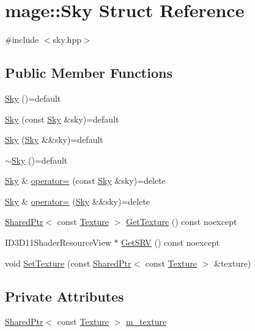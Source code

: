 \hypertarget{structmage_1_1_sky}{}\section{mage\+:\+:Sky Struct Reference}
\label{structmage_1_1_sky}


{\ttfamily \#include $<$sky.\+hpp$>$}

\subsection*{Public Member Functions}
\begin{DoxyCompactItemize}
\item 
\hyperlink{structmage_1_1_sky_a4e54074f11814aee89e2554f35e551aa}{Sky} ()=default
\item 
\hyperlink{structmage_1_1_sky_ab041650afed6344cd7874308def5c35c}{Sky} (const \hyperlink{structmage_1_1_sky}{Sky} \&sky)=default
\item 
\hyperlink{structmage_1_1_sky_acf43250f4e0af2e3ab262c6c36b19a9a}{Sky} (\hyperlink{structmage_1_1_sky}{Sky} \&\&sky)=default
\item 
\hyperlink{structmage_1_1_sky_a42c605bd010c1c6576c3ecf32cd0e962}{$\sim$\+Sky} ()=default
\item 
\hyperlink{structmage_1_1_sky}{Sky} \& \hyperlink{structmage_1_1_sky_a1ed7e2e383a87025347ee63b25f0f544}{operator=} (const \hyperlink{structmage_1_1_sky}{Sky} \&sky)=delete
\item 
\hyperlink{structmage_1_1_sky}{Sky} \& \hyperlink{structmage_1_1_sky_a07e7ad68f471344d06357ea68b82ef84}{operator=} (\hyperlink{structmage_1_1_sky}{Sky} \&\&sky)=delete
\item 
\hyperlink{namespacemage_a1e01ae66713838a7a67d30e44c67703e}{Shared\+Ptr}$<$ const \hyperlink{classmage_1_1_texture}{Texture} $>$ \hyperlink{structmage_1_1_sky_abd49f247b3a376475471310d6396386b}{Get\+Texture} () const noexcept
\item 
I\+D3\+D11\+Shader\+Resource\+View $\ast$ \hyperlink{structmage_1_1_sky_ae72817d4b5015b985234183b6474f5d6}{Get\+S\+RV} () const noexcept
\item 
void \hyperlink{structmage_1_1_sky_aceb336c88ac33bb8490987812414578c}{Set\+Texture} (const \hyperlink{namespacemage_a1e01ae66713838a7a67d30e44c67703e}{Shared\+Ptr}$<$ const \hyperlink{classmage_1_1_texture}{Texture} $>$ \&texture)
\end{DoxyCompactItemize}
\subsection*{Private Attributes}
\begin{DoxyCompactItemize}
\item 
\hyperlink{namespacemage_a1e01ae66713838a7a67d30e44c67703e}{Shared\+Ptr}$<$ const \hyperlink{classmage_1_1_texture}{Texture} $>$ \hyperlink{structmage_1_1_sky_a4f9e8b3658134a04284174c419390a17}{m\+\_\+texture}
\end{DoxyCompactItemize}


